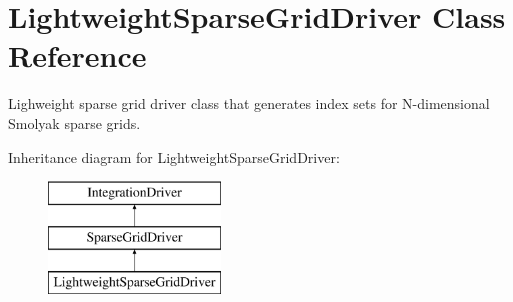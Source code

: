 \section{Lightweight\+Sparse\+Grid\+Driver Class Reference}
\label{classPecos_1_1LightweightSparseGridDriver}


Lighweight sparse grid driver class that generates index sets for N-\/dimensional Smolyak sparse grids.  


Inheritance diagram for Lightweight\+Sparse\+Grid\+Driver\+:\begin{figure}[H]
\begin{center}
\leavevmode
\includegraphics[height=3.000000cm]{classPecos_1_1LightweightSparseGridDriver}
\end{center}
\end{figure}
